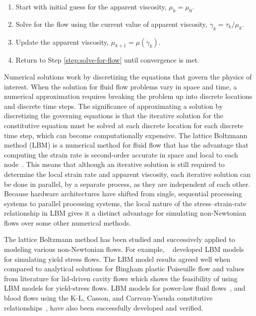\documentclass[pdftex,ms]{pittetd}
\begin{document}
\begin{enumerate}
	\item Start with initial guess for the apparent viscosity, $\mu_k = \mu_0$.
	\item \label{step:solve-for-flow} Solve for the flow using the current value of apparent viscosity, $\dot{\gamma}_k = \tau_k / \mu_k$.
	\item Update the apparent viscosity, $\mu_{k+1} = \mu(\dot{\gamma}_k)$.
	\item Return to Step \ref{step:solve-for-flow} until convergence is met.
\end{enumerate}

Numerical solutions work by discretizing the equations that govern the physics of interest.
When the solution for fluid flow problems vary in space and time, a numerical approximation requires breaking the problem up into discrete locations and discrete time steps.
The significance of approximating a solution by discretizing the governing equations is that the iterative solution for the constitutive equation must be solved at each discrete location for each discrete time step, which can become computationally expensive.
The lattice Boltzmann method (LBM) is a numerical method for fluid flow that has the advantage that computing the strain rate is second-order accurate in space and local to each node~\cite{kruger2010second}.
This means that although an iterative solution is still required to determine the local strain rate and apparent viscosity, each iterative solution can be done in parallel, by a separate process, as they are independent of each other.
Because hardware architectures have shifted from single, sequential processing systems to parallel processing systems, the local nature of the stress--strain-rate relationship in LBM gives it a distinct advantage for simulating non-Newtonian flows over some other numerical methods.

The lattice Boltzmann method has been studied and successively applied to modeling various non-Newtonian flows.
For example, ~\citet{tang2011bingham,chai2011multiple,fallah2012multiple,chen2014simulations,vikhansky2008lattice,wang2008lattice} developed LBM models for simulating yield stress flows.
The LBM model results agreed well when compared to analytical solutions for Bingham plastic Poiseuille flow and values from literature for lid-driven cavity flows which shows the feasibility of using LBM models for yield-stress flows.
LBM models for power-law fluid flows~\citet{wang2011lattice,wang2015localized,boyd2006second,chai2011multiple}, and blood flows using the K-L, Casson, and Carreau-Yasuda constitutive relationships~\citet{ashrafizaadeh2009comparison}, have also been successfully developed and verified. %
\end{document}
